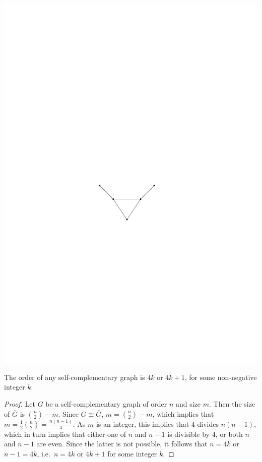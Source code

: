 \begin{center}
\includegraphics{Images/BullGraph.pdf}
\end{center}

\begin{Theorem}\label{thm:SCOrder}
The order of any self-complementary graph is $4k$ or $4k + 1$, for some non-negative integer $k$.
\end{Theorem}

\begin{proof}
Let $G$ be a self-complementary graph of order $n$ and size $m$. Then the size of $\overline G$ is $\binom n 2 - m$. Since $G \cong \overline G$, $m = \binom n 2 - m$, which implies that $m = \frac 1 2 \binom n 2 = \frac {n(n - 1)}{4}$. As $m$ is an integer, this implies that $4$ divides $n(n - 1)$, which in turn implies that either one of $n$ and $n - 1$ is divisible by $4$, or both $n$ and $n - 1$ are even. Since the latter is not possible, it follows that $n = 4k$ or $n - 1 = 4k$, i.e.\ $n = 4k$ or $4k + 1$ for some integer $k$.
\end{proof}


